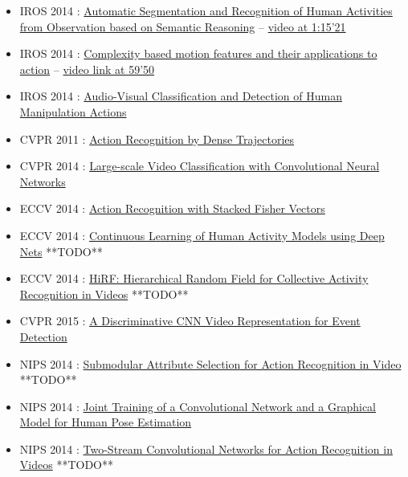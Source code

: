 \documentclass[a4paper]{article}
\begin{document}
		\begin{itemize}
			\item IROS 2014 : \href{http://mediatum.ub.tum.de/doc/1244178/00196267309484.pdf}{Automatic Segmentation and Recognition of Human Activities from Observation based on Semantic Reasoning}\cite{ramirez2014automatic} -- \href{https://www.youtube.com/watch?v=oeH1oy5Htz4}{video at 1:15'21}
			\item IROS 2014 : \href{https://www.deepdyve.com/lp/institute-of-electrical-and-electronics-engineers/complexity-based-motion-features-and-their-applications-to-action-xmhZ06qZYP}{Complexity based motion features and their applications to action}\cite{kwon2014complexity} -- \href{https://www.youtube.com/watch?v=hW_AEQnSdCs}{video link at 59'50}
			\item IROS 2014 : \href{http://www.csc.kth.se/~hedvig/publications/iros_14.pdf}{Audio-Visual Classification and Detection of Human Manipulation Actions}\cite{pieropan2014audio}

			\item CVPR 2011 : \href{https://hal.inria.fr/inria-00583818/document}{Action Recognition by Dense Trajectories}\cite{wang2011action}
			\item CVPR 2014 : \href{http://www.cv-foundation.org/openaccess/content_cvpr_2014/papers/Karpathy_Large-scale_Video_Classification_2014_CVPR_paper.pdf}{Large-scale Video Classification with Convolutional Neural Networks}\cite{karpathy2014large}
			\item ECCV 2014 : \href{http://pengxj.github.io/papers/PZQP_ECCV14_SFV.pdf}{Action Recognition with Stacked Fisher Vectors}\cite{peng2014action}
			\item ECCV 2014 : \href{http://www.ee.ucr.edu/~mhasan/papers/eccv2014HasanAmit.pdf}{Continuous Learning of Human Activity Models using Deep Nets} **TODO**
			\item ECCV 2014 : \href{http://web.engr.oregonstate.edu/~sinisa/research/publications/eccv14_HiRF.pdf}{HiRF: Hierarchical Random Field for Collective Activity Recognition in Videos} **TODO**
			\item  CVPR 2015 : \href{http://arxiv.org/pdf/1411.4006.pdf}{A Discriminative CNN Video Representation for Event Detection}\cite{xu2014discriminative}


			\item NIPS 2014 : \href{http://papers.nips.cc/paper/5565-submodular-attribute-selection-for-action-recognition-in-video.pdf}{Submodular Attribute Selection for Action Recognition in Video} **TODO**
			\item NIPS 2014 : \href{http://papers.nips.cc/paper/5573-joint-training-of-a-convolutional-network-and-a-graphical-model-for-human-pose-estimation.pdf}{Joint Training of a Convolutional Network and a Graphical Model for Human Pose Estimation}\cite{tompson2014joint}
			\item NIPS 2014 : \href{http://papers.nips.cc/paper/5353-two-stream-convolutional-networks-for-action-recognition-in-videos.pdf}{Two-Stream Convolutional Networks for Action Recognition in Videos} **TODO**
		\end{itemize}
\end{document}
